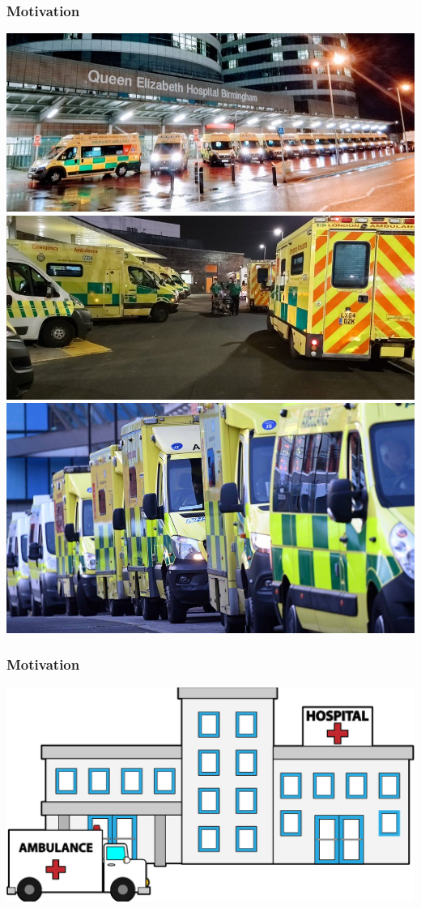 \begin{frame}
    \frametitle{Motivation}
    
    \centering
    \includegraphics[scale=0.37]{Bin/ambulance_queue_1.jpg}
    \includegraphics[scale=0.15]{Bin/ambulance_queue_2.jpg}
    \includegraphics[scale=0.15]{Bin/ambulance_queue_3.jpg}

\end{frame}



\begin{frame}
    \frametitle{Motivation}

    \centering
    \includegraphics[scale=0.15]{Bin/hospital_ambulance_toon.png}

\end{frame}